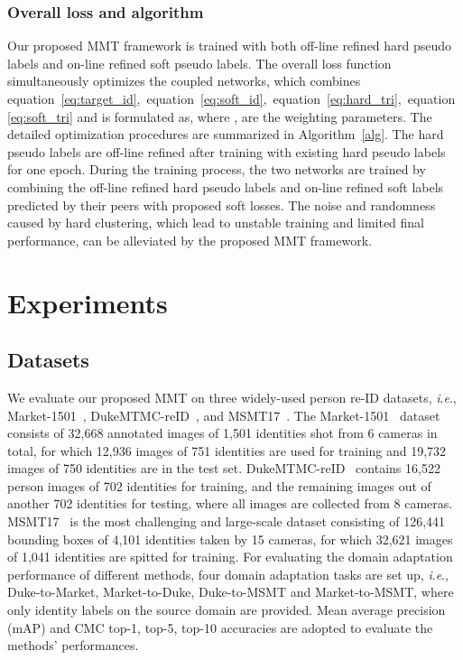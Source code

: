 \documentclass{article} \usepackage{iclr2020_conference,times}
\def\eqref#1{equation~\ref{#1}}
\newcommand{\ie}{\textit{i}.\textit{e}., }
\begin{document}
\subsubsection{Overall loss and algorithm} 
\vspace{-5pt}
Our proposed MMT framework is trained with both off-line refined hard pseudo labels and on-line refined soft pseudo labels.
The overall loss function  simultaneously optimizes the coupled networks, which combines \eqref{eq:target_id},~\eqref{eq:soft_id},~\eqref{eq:hard_tri},~\eqref{eq:soft_tri} and is formulated as,
{\small
}where ,  are the weighting parameters.
The detailed optimization procedures are summarized in Algorithm~\ref{alg}. The hard pseudo labels are off-line refined after training with existing hard pseudo labels for one epoch. 
During the training process, the two networks are trained by combining the off-line refined hard pseudo labels and on-line refined soft labels predicted by their peers with proposed soft losses. 
The noise and randomness caused by hard clustering, which lead to unstable training and limited final performance, can be alleviated by the proposed MMT framework.

\section{Experiments}
\subsection{Datasets}
\vspace{-5pt}
We evaluate our proposed MMT on three widely-used person re-ID datasets, \ie Market-1501~\citep{market}, DukeMTMC-reID~\citep{dukemtmc}, and MSMT17~\citep{wei2018person}.
The Market-1501~\citep{market} dataset consists of 32,668 annotated images of 1,501 identities shot from 6 cameras in total, for which 12,936 images of 751 identities are used for training and 19,732 images of 750 identities are in the test set.
DukeMTMC-reID~\citep{dukemtmc} contains 16,522 person images of 702 identities for training, and the remaining images out of another 702 identities for testing, where all images are collected from 8 cameras.
MSMT17~\citep{wei2018person} is the most challenging and large-scale dataset consisting of 126,441 bounding boxes of 4,101 identities taken by 15 cameras, for which 32,621 images of 1,041 identities are spitted for training.
For evaluating the domain adaptation performance of different methods, four domain adaptation tasks are set up, \ie Duke-to-Market, Market-to-Duke, Duke-to-MSMT and Market-to-MSMT, where only identity labels on the source domain are provided. Mean average precision (mAP) and CMC top-1, top-5, top-10 accuracies are adopted to evaluate the methods' performances.
\end{document}
